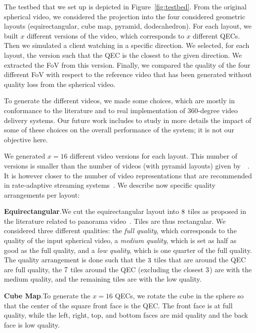\documentclass{sig-alternate}
\renewcommand\citet[1]{\citeauthor{#1}~\cite{#1}} %
\newcommand{\parag}[1]{\vspace{5pt}\noindent\textbf{#1}.\hspace{5pt}}
\begin{document}
The testbed that we
set up is depicted in Figure~\ref{fig:testbed}. From the original spherical video, we considered the 
projection 
into the four considered geometric layouts (equirectangular, cube map, pyramid, dodecahedron). For 
each layout, we built
$x$ different versions of the video, which corresponds to $x$ different \acp{QEC}. Then we simulated
a client watching in a specific direction. We selected, for each layout, the version such that the \ac{QEC}
is the closest to the given direction. We extracted the \ac{FoV} from this version. Finally, we compared
the quality of the four different \ac{FoV} with respect to the reference video that has been generated
without quality loss from the spherical video.



To generate the different videos, we made some choices, which are mostly in conformance to the
literature and to real implementation of 360-degree video delivery systems. Our future work 
includes to study in more details the impact of some of these choices on
the overall performance of the system; it is not our objective here.

We generated $x=16$ different video versions for each layout. This number of versions is smaller than
the number of videos (with pyramid layouts) given by~\citet{facebook}. It is however closer to the
number of video representations that are recommended in rate-adaptive streaming 
systems~\cite{Aparicio-PardoP15}. We describe now specific quality arrangements per layout:

\parag{Equirectangular}We cut the equirectangular layout into $8\time 8$ tiles as proposed in
the literature related to panorama video~\cite{gaddam_tiling_2015}. Tiles are thus rectangular.
We considered three different qualities: the \emph{full quality}, which corresponds to the quality of the
input spherical video, a \emph{medium quality}, which is set as half as good as the full quality, and a 
\emph{low quality}, which is one quarter of the full quality. The quality arrangement is done such that
the $3\time 3$ tiles that are around the \ac{QEC} are full quality, the $7\time 7$ tiles around 
the \ac{QEC} (excluding the closest $3\time 3$) are with the medium quality, and the remaining tiles
are with the low quality.

\parag{Cube Map}To generate the $x=16$ \acp{QEC}, we rotate the cube in the sphere so that the
center of the square front face is the \ac{QEC}. The front face is at full quality, while the left, right, 
top, and bottom faces are mid quality and the back face is low quality.
\end{document}
